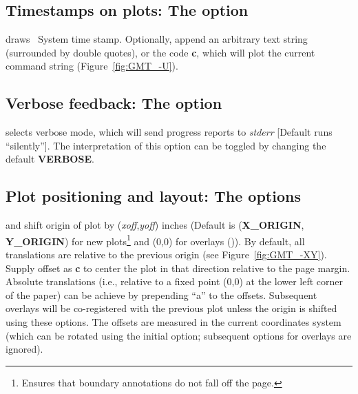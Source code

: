 \subsection{Timestamps on plots: The  option} 

 draws \UNIX\ System time stamp.  Optionally, append an arbitrary
text string (surrounded by double quotes), or the code \textbf{c}, which will
plot the current command string (Figure~\ref{fig:GMT_-U}).


\subsection{Verbose feedback: The  option} 
\label{sec:verbose}
 selects verbose mode, which will send progress reports to
\emph{stderr} [Default runs ``silently''].  The interpretation of
this option can be toggled by changing the default \textbf{VERBOSE}.

\subsection{Plot positioning and layout: The   options}

 and  shift origin of plot by (\emph{xoff},\emph{yoff})
inches (Default is (\textbf{X\_ORIGIN}, \textbf{Y\_ORIGIN}) for new plots\footnote{Ensures that
boundary annotations do not fall off the page.} and (0,0) for overlays ()).
By default, all translations are relative to the previous origin
(see Figure~\ref{fig:GMT_-XY}).  Supply offset as \textbf{c} to center the
plot in that direction relative to the page margin.
Absolute translations (i.e., relative to a fixed point (0,0) at the
lower left corner of the paper) can be achieve by prepending ``a''
to the offsets.  Subsequent overlays will be co-registered with the
previous plot unless the origin is shifted using these options.
The offsets are measured in the current coordinates system (which can
be rotated using the initial  option; subsequent  options
for overlays are ignored).

